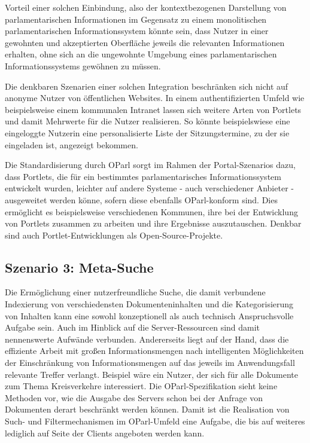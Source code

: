 \documentclass[,a4paper]{article}
\begin{document}
Vorteil einer solchen Einbindung, also der kontextbezogenen Darstellung
von parlamentarischen Informationen im Gegensatz zu einem monolitischen
parlamentarischen Informationssystem könnte sein, dass Nutzer in einer
gewohnten und akzeptierten Oberfläche jeweils die relevanten
Informationen erhalten, ohne sich an die ungewohnte Umgebung eines
parlamentarischen Informationssystems gewöhnen zu müssen.

Die denkbaren Szenarien einer solchen Integration beschränken sich nicht
auf anonyme Nutzer von öffentlichen Websites. In einem authentifizierten
Umfeld wie beispielsweise einem kommunalen Intranet lassen sich weitere
Arten von Portlets und damit Mehrwerte für die Nutzer realisieren. So
könnte beispielswiese eine eingeloggte Nutzerin eine personalisierte
Liste der Sitzungstermine, zu der sie eingeladen ist, angezeigt
bekommen.

Die Standardisierung durch OParl sorgt im Rahmen der Portal-Szenarios
dazu, dass Portlets, die für ein bestimmtes parlamentarisches
Informationssystem entwickelt wurden, leichter auf andere Systeme - auch
verschiedener Anbieter - ausgeweitet werden könne, sofern diese
ebenfalls OParl-konform sind. Dies ermöglicht es beispielsweise
verschiedenen Kommunen, ihre bei der Entwicklung von Portlets zusammen
zu arbeiten und ihre Ergebnisse auszutauschen. Denkbar sind auch
Portlet-Entwicklungen als Open-Source-Projekte.

\subsection{Szenario 3: Meta-Suche}\label{szenarioux5fmetaux5fsuche}

Die Ermöglichung einer nutzerfreundliche Suche, die damit verbundene
Indexierung von verschiedensten Dokumenteninhalten und die
Kategorisierung von Inhalten kann eine sowohl konzeptionell als auch
technisch Anspruchsvolle Aufgabe sein. Auch im Hinblick auf die
Server-Ressourcen sind damit nennenswerte Aufwände verbunden.
Andererseits liegt auf der Hand, dass die effiziente Arbeit mit großen
Informationsmengen nach intelligenten Möglichkeiten der Einschränkung
von Informationsmengen auf das jeweils im Anwendungsfall relevante
Treffer verlangt. Beispiel wäre ein Nutzer, der sich für alle Dokumente
zum Thema Kreisverkehre interessiert. Die OParl-Spezifikation sieht
keine Methoden vor, wie die Ausgabe des Servers schon bei der Anfrage
von Dokumenten derart beschränkt werden können. Damit ist die
Realisation von Such- und Filtermechanismen im OParl-Umfeld eine
Aufgabe, die bis auf weiteres lediglich auf Seite der Clients angeboten
werden kann.
\end{document}
